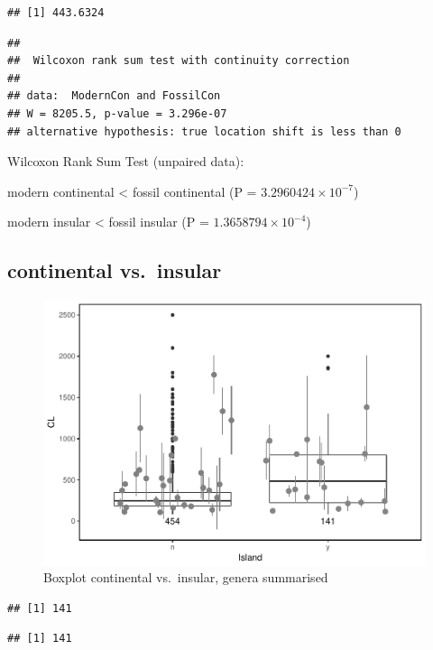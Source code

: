 \documentclass[]{article}
\begin{document}
\begin{verbatim}
## [1] 443.6324
\end{verbatim}

\begin{verbatim}
## 
##  Wilcoxon rank sum test with continuity correction
## 
## data:  ModernCon and FossilCon
## W = 8205.5, p-value = 3.296e-07
## alternative hypothesis: true location shift is less than 0
\end{verbatim}

Wilcoxon Rank Sum Test (unpaired data):

modern continental \textless{} fossil continental (P =
\(3.2960424\times 10^{-7}\))

modern insular \textless{} fossil insular (P =
\(1.3658794\times 10^{-4}\))

\newpage

\subsection{continental vs.~insular}\label{continental-vs.insular-1}

\begin{figure}[htbp]
\centering
\includegraphics{MA_JJ_files/figure-latex/Boxplot continental vs. insular-1.pdf}
\caption{Boxplot continental vs.~insular, genera summarised}
\end{figure}

\begin{verbatim}
## [1] 141
\end{verbatim}

\begin{verbatim}
## [1] 141
\end{verbatim}
\end{document}
